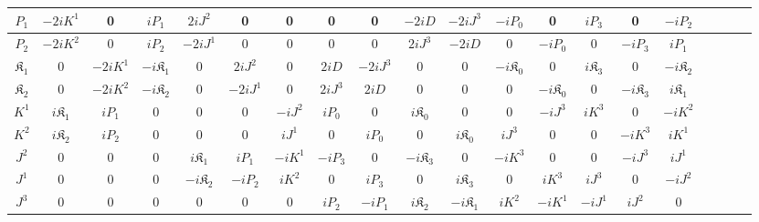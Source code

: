 \documentclass[%
 reprint,
superscriptaddress,
 amsmath,amssymb,
 aps,
]{revtex4-2}
\begin{document}
\begin{widetext}
\begin{center}
\begin{table}[h!]
{\begin{tabular}{ |c||c|c|c|c|c|c|c|c|c|c|c|c|c|c|c|c|c|c|c| }
 \hline 
 \rule{0pt}{16pt} $P_{{1}}$ &$-2i{K}^{{1}}$&0&$iP_{{1}}$&${2i{J}^{{2}}}$&0&0&0&0&$-2iD$&$-2iJ^{{3}}$&$-iP_{{0}}$&0&${iP_{{3}}}$&0&$-iP_{{2}}$\\
 \hline 
 \rule{0pt}{16pt} $P_{{2}}$ &$-2i{K}^{{2}}$&0&$iP_{{2}}$&${-2i{J}^{{1}}}$&0&0&0&0&$2iJ^{{3}}$&$-2iD$&0&$-iP_{{0}}$&0&${-iP_{{3}}}$&$iP_{{1}}$\\
 \hline 
 \rule{0pt}{16pt} $\mathfrak{K}_{{1}}$ &0&$-2i{K}^{{1}}$&$-i\mathfrak{K}_{{1}}$&0&${2i{J}^{{2}}}$&0&$2iD$&$-2iJ^{{3}}$&0&0&$-i\mathfrak{K}_{{0}}$&0&${i\mathfrak{K}_{{3}}}$&0&$-i\mathfrak{K}_{{2}}$\\
 \hline 
 \rule{0pt}{16pt} $\mathfrak{K}_{{2}}$ &0&$-2i{K}^{{2}}$&$-i\mathfrak{K}_{{2}}$&0&${-2i{J}^{{1}}}$&0&$2iJ^{{3}}$&$2iD$&0&0&0&$-i\mathfrak{K}_{{0}}$&0&${-i\mathfrak{K}_{{3}}}$&$i\mathfrak{K}_{{1}}$\\
 \hline 
 \rule{0pt}{16pt} ${K}^{{1}}$ &$i\mathfrak{K}_{{1}}$&$iP_{{1}}$&0&0&0&$-i{J}^{{2}}$&$iP_{{0}}$&0&$i\mathfrak{K}_{{0}}$&0&0&$-iJ^{{3}}$&${iK^{{3}}}$&0&$-i{K}^{{2}}$\\
 \hline 
 \rule{0pt}{16pt} ${K}^{{2}}$ &$i\mathfrak{K}_{{2}}$&$iP_{{2}}$&0&0&0&$i{J}^{{1}}$&0&$iP_{{0}}$&0&$i\mathfrak{K}_{{0}}$&$iJ^{{3}}$&0&0&${-iK^{{3}}}$&$i{K}^{{1}}$\\
 \hline 
 \rule{0pt}{16pt} ${J}^{{2}}$ &0&0&0&${i\mathfrak{K}_{{1}}}$&${iP_{{1}}}$&$-i{K}^{{1}}$&$-iP_{{3}}$&0&${-i\mathfrak{K}_{{3}}}$&0&$-iK^{{3}}$&0&0&$-iJ^{{3}}$&$i{J}^{{1}}$\\
 \hline 
 \rule{0pt}{16pt} ${J}^{{1}}$ &0&0&0&${-i\mathfrak{K}_{{2}}}$&${-iP_{{2}}}$&$i{K}^{{2}}$&0&$iP_{{3}}$&0&${i\mathfrak{K}_{{3}}}$&0&$iK^{{3}}$&$iJ^{{3}}$&0&$-i{J}^{{2}}$\\
 \hline 
 \rule{0pt}{16pt} $J^{{3}}$ &0&0&0&0&0&0&$iP_{{2}}$&$-iP_{{1}}$&$i\mathfrak{K}_{{2}}$&$-i\mathfrak{K}_{{1}}$&$i{K}^{{2}}$&$-i{K}^{{1}}$&$-i{J}^{{1}}$&$i{J}^{{2}}$&0\\
 \hline 
\end{tabular}}
\label{tabelIFD}
\end{table}
\end{center}


\end{widetext}
\end{document}
